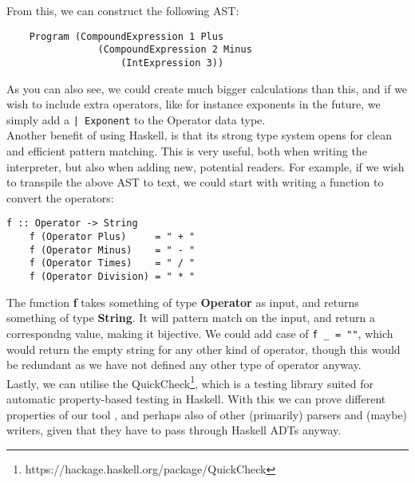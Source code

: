 From this, we can construct the following AST:

\begin{verbatim}
    Program (CompoundExpression 1 Plus
                (CompoundExpression 2 Minus
                    (IntExpression 3))
\end{verbatim}

As you can also see, we could create much bigger calculations than this, and if we wish to include extra operators, like for instance exponents in the future, we simply add a \texttt{| Exponent} to the Operator data type. \hfill \\

Another benefit of using Haskell, is that its strong type system opens for clean and efficient pattern matching. This is very useful, both when writing the interpreter, but also when adding new, potential readers. For example, if we wish to transpile the above AST to text, we could start with writing a function to convert the operators:

\begin{lstlisting}[caption={Haskell example to convert data type to string}, captionpos=b]
    f :: Operator -> String
    f (Operator Plus)     = " + "
    f (Operator Minus)    = " - "
    f (Operator Times)    = " / "
    f (Operator Division) = " * "
\end{lstlisting}

The function \textbf{f} takes something of type \textbf{Operator} as input, and returns something of type \textbf{String}. It will pattern match on the input, and return a correspondng value, making it bijective. We could add case of \texttt{f \_ = ""}, which would return the empty string for any other kind of operator, though this would be redundant as we have not defined any other type of operator anyway. \hfill \\

Lastly, we can utilise the QuickCheck\footnote{https://hackage.haskell.org/package/QuickCheck}, which is a testing library suited for automatic property-based testing in Haskell. With this we can prove different properties of our tool \cite{DBLP:conf/icfp/ClaessenH00}, and perhaps also of other (primarily) parsers and (maybe) writers, given that they have to pass through Haskell ADTs anyway.